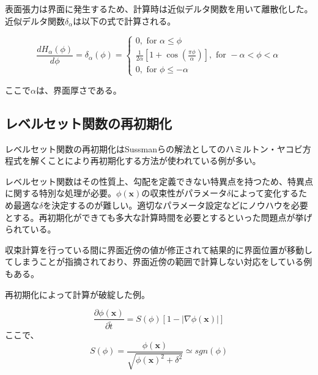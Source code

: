 表面張力は界面に発生するため、計算時は近似デルタ関数を用いて離散化した。
近似デルタ関数$\delta_{\alpha}$は以下の式で計算される。

\begin{equation}
\label{delta-function}
	\frac{d H_\alpha(\phi)}{d \phi} = \delta_\alpha(\phi) = \left\{\begin{array}{l}0, \text { for } \alpha \leq \phi \\ 
															\frac{1}{2 \alpha}\left[1+\cos \left(\frac{\pi \phi}{\alpha}\right)\right], \text { for }-\alpha<\phi<\alpha \\
															 0, \text { for } \phi \leq-\alpha\end{array}\right.
\end{equation}

ここで$\alpha$は、界面厚さである。



\subsection{レベルセット関数の再初期化}

レベルセット関数の再初期化はSussmanらの解法\cite{Sussman1994}としてのハミルトン・ヤコビ方程式を解くことにより再初期化する方法が使われている例が多い\cite{Himeno1999}。

レベルセット関数はその性質上、勾配を定義できない特異点を持つため、特異点に関する特別な処理が必要。$\phi(\bm{x})$の収束性がパラメータ$\delta$によって変化するため最適な$\delta$を決定するのが難しい。適切なパラメータ設定などにノウハウを必要とする。再初期化ができても多大な計算時間を必要とするといった問題点が挙げられている\cite{Yamazaki2007}。

収束計算を行っている間に界面近傍の値が修正されて結果的に界面位置が移動してしまうことが指摘されており、界面近傍の範囲で計算しない対応をしている例もある\cite{Tsubogo2003}。

再初期化によって計算が破綻した例\cite{Shono2017}。

\begin{equation}
\label{levelset-reinitialization}
	\frac{\partial \phi (\bm{x})}{\partial \tilde{t}} = S(\phi)[1-|\nabla \phi (\bm{x})|]
\end{equation}
ここで、
\begin{equation}
\label{levelset-reinitialization}
	S(\phi) = \frac{\phi (\bm{x})}{\sqrt{\phi(\bm{x})^2 + \delta^2}} \simeq sgn(\phi)
\end{equation}

